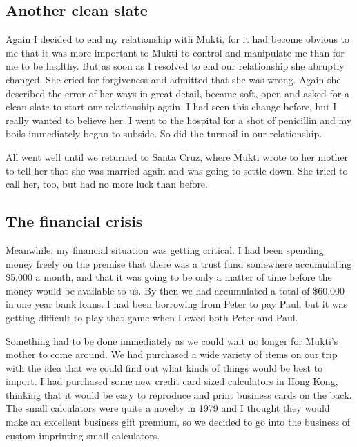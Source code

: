 \documentclass[a5paper,10pt,english]{book}
\begin{document}
\subsection{Another clean slate}
\label{\detokenize{psychopaths:another-clean-slate}}
\sphinxAtStartPar
Again I decided to end my relationship with Mukti, for it had become
obvious to me that it was more important to Mukti to control and
manipulate me than for me to be healthy. But as soon as I resolved to
end our relationship she abruptly changed. She cried for forgiveness and
admitted that she was wrong. Again she described the error of her ways
in great detail, became soft, open and asked for a clean slate to start
our relationship again. I had seen this change before, but I really
wanted to believe her. I went to the hospital for a shot of penicillin
and my boils immediately began to subside. So did the turmoil in our
relationship.

\sphinxAtStartPar
All went well until we returned to Santa Cruz, where Mukti wrote to her
mother to tell her that she was married again and was going to settle
down. She tried to call her, too, but had no more luck than before.


\subsection{The financial crisis}
\label{\detokenize{psychopaths:the-financial-crisis}}
\sphinxAtStartPar
Meanwhile, my financial situation was getting critical. I had been
spending money freely on the premise that there was a trust fund
somewhere accumulating \$5,000 a month, and that it was going to be only
a matter of time before the money would be available to us. By then we
had accumulated a total of \$60,000 in one year bank loans. I had been
borrowing from Peter to pay Paul, but it was getting difficult to play
that game when I owed both Peter and Paul.

\sphinxAtStartPar
Something had to be done immediately as we could wait no longer for
Mukti’s mother to come around. We had purchased a wide variety of items
on our trip with the idea that we could find out what kinds of things
would be best to import. I had purchased some new credit card sized
calculators in Hong Kong, thinking that it would be easy to reproduce
and print business cards on the back. The small calculators were quite a
novelty in 1979 and I thought they would make an excellent business gift
premium, so we decided to go into the business of custom imprinting
small calculators.
\end{document}
